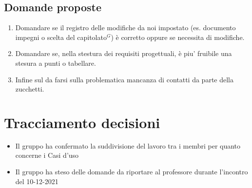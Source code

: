 \subsection{Domande proposte}
\begin{enumerate}
	\item Domandare se il registro delle modifiche da noi impostato (es. documento impegni o scelta del capitolato$^{G}$) è corretto oppure se necessita di modifiche.
	\item Domandare se, nella stestura dei requisiti progettuali, è piu' fruibile una stesura a punti o tabellare.
	\item Infine sul da farsi sulla problematica mancanza di contatti da parte della zucchetti.
\end{enumerate}

\section{Tracciamento decisioni}
\begin{itemize}
	\item Il gruppo ha confermato la suddivisione del lavoro tra i membri per quanto concerne i Casi d'uso
	\item Il gruppo ha steso delle domande da riportare al professore durante l'incontro del 10-12-2021
\end{itemize}